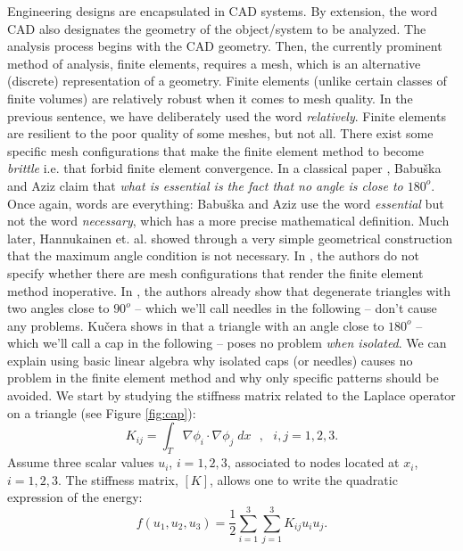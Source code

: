 \documentclass{article}
\theoremstyle{remark}
\begin{document}
Engineering designs are encapsulated in CAD systems. By extension, the word CAD also designates the geometry of the object/system to be analyzed. The analysis process begins with the CAD geometry. Then, the currently prominent method of analysis, finite elements, requires a mesh, which is an alternative (discrete) representation of a geometry. 
Finite elements (unlike certain classes of finite volumes) are relatively robust when it comes to mesh quality. In the previous sentence, we have deliberately used the word \emph{relatively}. Finite elements are resilient to the poor quality of some meshes, but not all. There exist some specific mesh configurations that make the finite element method to become \emph{brittle} i.e. that forbid finite element convergence. In a classical paper \cite{babuvska1976angle}, Babu{\v{s}}ka and Aziz claim that \emph{what is essential is the fact that no angle is close to $180^o$}. Once again, words are everything: Babu{\v{s}}ka and Aziz use the  word \emph{essential} but not the word \emph{necessary}, which has a more precise mathematical definition. Much later, Hannukainen et. al. \cite{hannukainen2012maximum} showed through a very simple geometrical construction that the maximum angle condition is not necessary. In \cite{hannukainen2012maximum}, the authors do not specify whether there are mesh configurations that render the finite element method inoperative. In \cite{babuvska1976angle}, the authors already show that degenerate triangles with two angles close to $90^o$ -- which we'll call needles in the following -- don't cause any problems. Ku{\v{c}}era shows in \cite{kuvcera2016necessary} that a triangle with an angle close to $180^o$ -- which we'll call a cap in the following -- poses no problem \emph{when isolated}. We  can explain using basic linear algebra why isolated caps (or needles) causes no problem in the finite element method and why
only specific patterns should be avoided. We start by studying the stiffness matrix related to the Laplace operator on
a triangle (see Figure \ref{fig:cap}):
$$K_{ij} = \int_{T} \nabla \phi_i \cdot \nabla \phi_j \;
dx~~~,~~~i,j=1,2,3.$$
Assume three scalar values $u_i$, $i=1,2,3$, associated to nodes located at 
$x_i$, $i=1,2,3$. The stiffness matrix, $[K]$, allows one to write the quadratic expression
of the energy:
\begin{equation}
f(u_1,u_2,u_3) = \frac12 \sum_{i=1}^3\sum_{j=1}^3K_{ij} u_i u_j.
\label{eq:quadf}
\end{equation}
\end{document}
